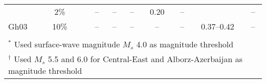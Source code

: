 \begin{table*}[t]
\begin{tabular}{lccccccccc}
            &   2\%  &&   --        &   --        &   --        &   0.20      &   --        &             &   --        \\
    Gh03    &  10\%  &&   --        &   --        &   --        &   --        &   --        & 0.37--0.42  &   --        \\[0.6ex]
    \hline                                                                                                              \\[-1.6ex]
    \multicolumn{10}{l}{\small{${}^{*}$ Used surface-wave magnitude $M_s$ 4.0 as magnitude threshold}}                  \\
    \multicolumn{10}{l}{\small{${}^{\dagger}$ Used $M_s$ 5.5 and 6.0 for Central-East and Alborz-Azerbaijan as magnitude threshold}}    
\end{tabular}
\label{tab:pga} 
\end{table*}
